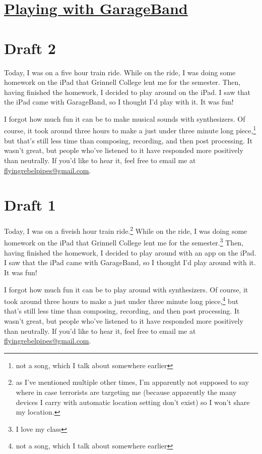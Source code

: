 \documentclass[12pt]{article}[titlepage]
\newcommand{\1}{\={a}}
\newcommand{\2}{\={e}}
\newcommand{\3}{\={\i}}
\newcommand{\4}{\=o}
\newcommand{\5}{\=u}
\newcommand{\6}{\={A}}
\renewcommand{\,}{\textsuperscript{,}}
\begin{document}
\doublespacing
\section{\href{playing-with-garageband.html}{Playing with GarageBand}}
\section{Draft 2}
Today, I was on a five hour train ride.
While on the ride, I was doing some homework on the iPad that Grinnell College lent me for the semester.
Then, having finished the homework, I decided to play around on the iPad.
I saw that the iPad came with GarageBand, so I thought I'd play with it.
It was fun!

I forgot how much fun it can be to make musical sounds with synthesizers.
Of course, it took around three hours to make a just under three minute long piece,\footnote{not a song, which I talk about somewhere earlier} but that's still less time than composing, recording, and then post processing.
It wasn't great, but people who've listened to it have responded more positively than neutrally.
If you'd like to hear it, feel free to email me at \href{mailto:flyingrebelpipes@gmail.com}{flyingrebelpipes@gmail.com}.
\section{Draft 1}
Today, I was on a fiveish hour train ride.\footnote{as I've mentioned multiple other times, I'm apparently not supposed to say where in case terrorists are targeting me (because apparently the many devices I carry with automatic location setting don't exist) so I won't share my location.}
While on the ride, I was doing some homework on the iPad that Grinnell College lent me for the semester.\footnote{I love my class}
Then, having finished the homework, I decided to play around with an app on the iPad.
I saw that the iPad came with GarageBand, so I thought I'd play around with it.
It was fun!

I forgot how much fun it can be to play around with synthesizers.
Of course, it took around three hours to make a just under three minute long piece,\footnote{not a song, which I talk about somewhere earlier} but that's still less time than composing, recording, and then post processing.
It wasn't great, but people who've listened to it have responded more positively than neutrally.
If you'd like to hear it, feel free to email me at \href{mailto:flyingrebelpipes@gmail.com}{flyingrebelpipes@gmail.com}.
\end{document}
